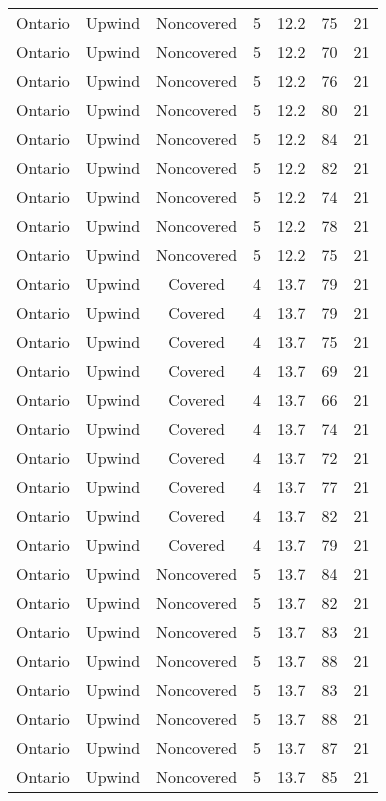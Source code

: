 \documentclass{article}
\begin{document}
\begin{longtable}[H]{ccccccc}
Ontario & Upwind   & Noncovered & 5 & 12.2 & 75  & 21 \\
Ontario & Upwind   & Noncovered & 5 & 12.2 & 70  & 21 \\
Ontario & Upwind   & Noncovered & 5 & 12.2 & 76  & 21 \\
Ontario & Upwind   & Noncovered & 5 & 12.2 & 80  & 21 \\
Ontario & Upwind   & Noncovered & 5 & 12.2 & 84  & 21 \\
Ontario & Upwind   & Noncovered & 5 & 12.2 & 82  & 21 \\
Ontario & Upwind   & Noncovered & 5 & 12.2 & 74  & 21 \\
Ontario & Upwind   & Noncovered & 5 & 12.2 & 78  & 21 \\
Ontario & Upwind   & Noncovered & 5 & 12.2 & 75  & 21 \\
Ontario & Upwind   & Covered     & 4 & 13.7 & 79  & 21 \\
Ontario & Upwind   & Covered     & 4 & 13.7 & 79  & 21 \\
Ontario & Upwind   & Covered     & 4 & 13.7 & 75  & 21 \\
Ontario & Upwind   & Covered     & 4 & 13.7 & 69  & 21 \\
Ontario & Upwind   & Covered     & 4 & 13.7 & 66  & 21 \\
Ontario & Upwind   & Covered     & 4 & 13.7 & 74  & 21 \\
Ontario & Upwind   & Covered     & 4 & 13.7 & 72  & 21 \\
Ontario & Upwind   & Covered     & 4 & 13.7 & 77  & 21 \\
Ontario & Upwind   & Covered     & 4 & 13.7 & 82  & 21 \\
Ontario & Upwind   & Covered     & 4 & 13.7 & 79  & 21 \\
Ontario & Upwind   & Noncovered & 5 & 13.7 & 84  & 21 \\
Ontario & Upwind   & Noncovered & 5 & 13.7 & 82  & 21 \\
Ontario & Upwind   & Noncovered & 5 & 13.7 & 83  & 21 \\
Ontario & Upwind   & Noncovered & 5 & 13.7 & 88  & 21 \\
Ontario & Upwind   & Noncovered & 5 & 13.7 & 83  & 21 \\
Ontario & Upwind   & Noncovered & 5 & 13.7 & 88  & 21 \\
Ontario & Upwind   & Noncovered & 5 & 13.7 & 87  & 21 \\
Ontario & Upwind   & Noncovered & 5 & 13.7 & 85  & 21 \\

\end{longtable}
\end{document}
